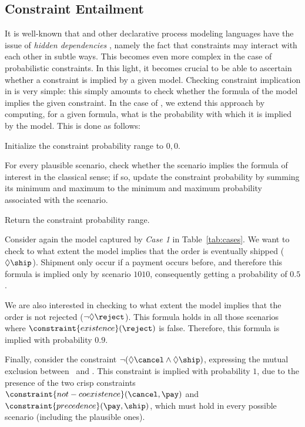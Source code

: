 \subsection{Constraint Entailment}
It is well-known that \declare and other declarative process modeling languages have the issue of \emph{hidden dependencies} \cite{MPVC11}, namely the fact that constraints may interact with each other in subtle ways. This becomes even more complex in the case of probabilistic constraints. In this light, it becomes crucial to be able to ascertain whether a constraint is implied by a given model. Checking constraint implication in \declare is very simple: this simply amounts to check whether the \LTLf formula of the model implies the given constraint. In the case of \pdeclare, we extend this approach by computing, for a given \LTLf formula, what is the probability with which it is implied by the \pdeclare model. This is done as follows:
\begin{inparaenum}[(1)]
\item Initialize the constraint probability range to $0,0$.
\item For every plausible scenario, check whether the scenario implies the formula of interest in the classical \LTLf sense; if so, update the constraint probability by summing its minimum and maximum to the minimum and maximum probability associated with the scenario.
\item Return the constraint probability range.
\end{inparaenum}

\begin{example}
  Consider again the \pdeclare model captured by \emph{Case 1} in Table~\ref{tab:cases}. We want to check to what extent the model implies that the order is eventually shipped ($\Diamond \ship$). Shipment only occur if a payment occurs before, and therefore this formula is implied only by scenario $1010$, consequently getting a probability of $0.5$.

  We are also interested in checking to what extent the model implies that the order is not rejected ($\neg \Diamond \reject$). This formula holds in all those scenarios where $\constraint{existence}(\reject)$ is false. Therefore, this formula is implied with probability $0.9$.

  Finally, consider the \LTLf constraint $\neg(\Diamond \cancel \land \Diamond \ship)$, expressing the mutual exclusion between \cancel\ and \ship. This constraint is implied with probability $1$, due to the presence of the two crisp constraints $\constraint{not-coexistence}(\cancel,\pay)$ and $\constraint{precedence}(\pay,\ship)$, which must hold in every possible scenario (including the plausible ones).
\end{example}







